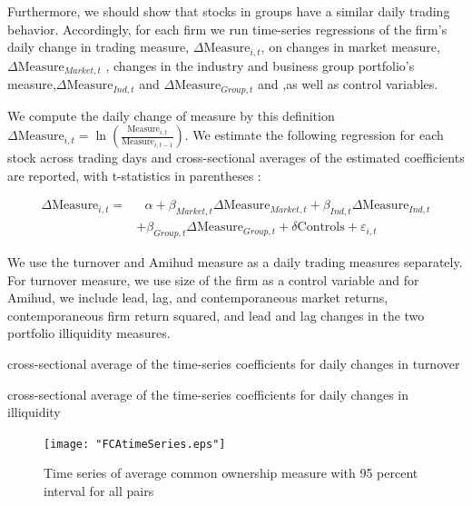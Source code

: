 \documentclass[12pt, a4paper]{article}
\begin{document}
Furthermore, we should show that stocks in groups have a similar daily trading behavior. Accordingly, for each firm we run time-series regressions of the firm's daily change in trading measure, $ \Delta \text{Measure}_{i,t} $, on changes in market measure,$ \Delta\text{Measure}_{Market,t}   $ , changes in the industry and business group portfolio's measure,$ \Delta\text{Measure}_{Ind,t} $ and  $\Delta \text{Measure}_{Group,t} $ and  ,as well as control variables.

 We compute the daily change of measure by this definition $ \Delta \text{Measure}_{i,t} = \ln(\frac{\text{Measure}_{i,t}}{\text{Measure}_{i,t-1}}) $. 
We estimate the following regression for each stock across trading days and cross-sectional averages of the estimated coefficients are reported, with t-statistics in parentheses :

\begin{equation*}
	\begin{split}
			\Delta \text{Measure}_{i,t} =  & \text{	}\alpha + \beta_{Market,t} \Delta \text{Measure}_{Market,t}  
		+ \beta_{Ind,t} \Delta \text{Measure}_{Ind,t} \\ & + \beta_{Group,t} \Delta \text{Measure}_{Group,t} + \delta\text{Controls} + \varepsilon_{i,t}
	\end{split}
\end{equation*}

We use the turnover and Amihud measure as a daily trading measures separately. For turnover measure, we use size of the firm as a control variable and for Amihud, we include lead, lag, and contemporaneous market returns, contemporaneous firm return squared, and lead and lag changes in the two portfolio illiquidity measures.

	\begin{table}[htbp]
	\centering
	\caption{cross-sectional average of the time-series coefficients for daily changes in turnover }
	\resizebox{0.6\textheight}{!}{
		
	}
\end{table}


	\begin{table}[htbp]
	\centering
	\caption{cross-sectional average of the time-series coefficients for daily changes in illiquidity  }
	\resizebox{0.7\textheight}{!}{
		\centering
		
	}
\end{table}

\newpage
		\begin{figure}
	\centering  
	\caption{Time series of average common ownership measure with 95 percent interval for all pairs}
	\texttt{[image: "FCAtimeSeries.eps"]}
	
\end{figure} 
\end{document}

